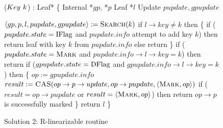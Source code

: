 \begin{figure*}[h]
	\footnotesize
	
	\begin{code}
		($Key\ k$) : Leaf* \{ \nlc
			\n Internal *$gp$, *$p$\nlc
			Leaf *$l$\nlc
			Update $pupdate, gpupdate$\bl
			\nlc
			
			$\langle gp, p, l, pupdate, gpupdate \rangle := \mbox{\sc Search}(k)$\nlc
			if $l\rightarrow key \neq k$ then \{ \nlc
				\n if ($pupdate.state = \mbox{IFlag}$ and $pupdate.info$ attempt to add key $k$) then \nlc
					\n return leaf with key $k$ from $pupdate.info$ \nlc \p
				else return \NULL \nlc \p
			\} \nlc
			if ($pupdate.state = \mbox{\sc Mark}$ and $pupdate.info \rightarrow l \rightarrow key = k$) then return \NULL \nlc
			if ($gpupdate.state = \mbox{DFlag}$ and $gpupdate.info \rightarrow l \rightarrow key = k$) then \{ \nlc
				\n $op := gpupdate.info$ \nlc
				$result := \mbox{\sc CAS}(op\rightarrow p\rightarrow update, op\rightarrow pupdate, \langle \mbox{\sc Mark}, op\rangle)$ \label{mark-cas}\nlc     
				if ($result = op\rightarrow pupdate$ or $result = \langle \mbox{\sc Mark}, op\rangle$) then return \NULL \label{checkmark} \tabtabcom $op\rightarrow p$ is successfully marked \nlc \p
			\} \nlc
			return $l$ \nlc \p
		\}
	\end{code}

	\caption{Solution 2: R-linearizable  routine}
	\label{robust find - solution 2}
\end{figure*}




